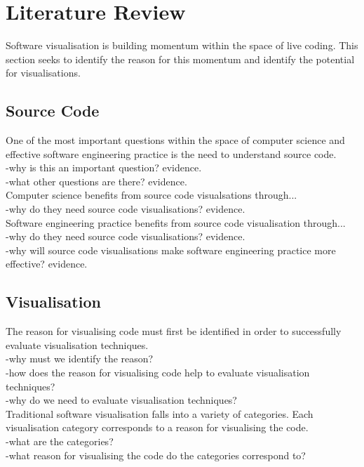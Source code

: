 
\chapter{Literature Review}
\label{cha:literaturereview}

Software visualisation is building momentum within the space of live coding. This section seeks to identify the reason for this momentum and identify the potential for visualisations.

\section{Source Code}

One of the most important questions within the space of computer science and effective software engineering practice is the need to understand source code.\\
-why is this an important question? evidence.\\
-what other questions are there? evidence.\\

Computer science benefits from source code visualsations through...\\
-why do they need source code visualisations? evidence.\\

Software engineering practice benefits from source code visualisation through...\\
-why do they need source code visualisations? evidence.\\
-why will source code visualisations make software engineering practice more effective? evidence.\\


\section{Visualisation}

The reason for visualising code must first be identified in order to successfully evaluate visualisation techniques.\\
-why must we identify the reason?\\
-how does the reason for visualising code help to evaluate visualisation techniques?\\
-why do we need to evaluate visualisation techniques?\\

Traditional software visualisation falls into a variety of categories. Each visualisation category corresponds to a reason for visualising the code.\\
-what are the categories?\\
-what reason for visualising the code do the categories correspond to?\\

